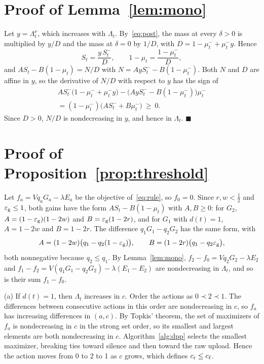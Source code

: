 \documentclass[5p,twocolumn]{elsarticle}
\theoremstyle{remark}
\newcommand{\lab}{\ell}
\newcommand{\ee}{\varepsilon}
\begin{document}
\appendix
\section{Proof of Lemma~\ref{lem:mono}}\label{app:mono}
Let $y=\Lambda_t^{\nu}$, which increases with $\Lambda_t$. By~\eqref{eq:post}, the mass at every $\delta>0$ is multiplied by $y/D$ and the mass at $\delta=0$ by $1/D$, with $D=1-\mu^-_t+\mu^-_ty$. Hence
\[
S_t=\frac{y\,S^-_t}{D},\qquad 1-\mu_t=\frac{1-\mu^-_t}{D},
\]
and $AS_t-B(1-\mu_t)=N/D$ with $N=AyS^-_t-B(1-\mu^-_t)$. Both $N$ and $D$ are affine in $y$, so the derivative of $N/D$ with respect to $y$ has the sign of
\begin{multline*}
AS^-_t\big(1-\mu^-_t+\mu^-_ty\big)-\big(AyS^-_t-B(1-\mu^-_t)\big)\mu^-_t\\
=(1-\mu^-_t)\big(AS^-_t+B\mu^-_t\big)\ \ge\ 0.
\end{multline*}
Since $D>0$, $N/D$ is nondecreasing in $y$, and hence in $\Lambda_t$. \hfill$\blacksquare$

\section{Proof of Proposition~\ref{prop:threshold}}\label{app:threshold}
Let $f_a=Vq_aG_a-\lambda E_a$ be the objective of~\eqref{eq:rule}, so $f_0=0$. Since $r,w<\frac12$ and $\ee_{\rm g}\le1$, both gains have the form $AS_t-B(1-\mu_t)$ with $A,B\ge0$: for $G_2$, $A=(1-\ee_{\rm g})(1-2w)$ and $B=\ee_{\rm g}(1-2r)$, and for $G_1$ with $d(t)=1$, $A=1-2w$ and $B=1-2r$. The difference $q_1G_1-q_2G_2$ has the same form, with
\[
A=(1-2w)\big(q_1-q_2(1-\ee_{\rm g})\big),\qquad B=(1-2r)\big(q_1-q_2\ee_{\rm g}\big),
\]
both nonnegative because $q_2\le q_1$. By Lemma~\ref{lem:mono}, $f_2-f_0=Vq_2G_2-\lambda E_2$ and $f_1-f_2=V(q_1G_1-q_2G_2)-\lambda(E_1-E_2)$ are nondecreasing in $\Lambda_t$, and so is their sum $f_1-f_0$.

(a) If $d(t)=1$, then $\Lambda_t$ increases in $c$. Order the actions as $0\prec2\prec1$. The differences between consecutive actions in this order are nondecreasing in $c$, so $f_a$ has increasing differences in $(a,c)$. By Topkis' theorem, the set of maximizers of $f_a$ is nondecreasing in $c$ in the strong set order, so its smallest and largest elements are both nondecreasing in $c$. Algorithm~\ref{alg:dpp} selects the smallest maximizer, breaking ties toward silence and then toward the raw upload. Hence the action moves from 0 to 2 to 1 as $c$ grows, which defines $c_{\rm r}\le c_{\lab}$.
\end{document}
